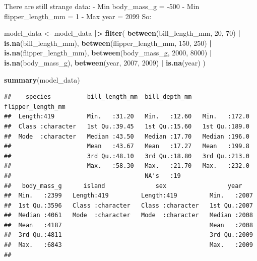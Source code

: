 \documentclass[
]{article}
\newenvironment{Shaded}{\begin{snugshade}}{\end{snugshade}}
\newcommand{\DecValTok}[1]{\textcolor[rgb]{0.00,0.00,0.81}{#1}}
\newcommand{\FunctionTok}[1]{\textcolor[rgb]{0.13,0.29,0.53}{\textbf{#1}}}
\newcommand{\NormalTok}[1]{#1}
\newcommand{\OtherTok}[1]{\textcolor[rgb]{0.56,0.35,0.01}{#1}}
\newcommand{\SpecialCharTok}[1]{\textcolor[rgb]{0.81,0.36,0.00}{\textbf{#1}}}
\begin{document}
There are still strange data: - Min body\_mass\_g = -500 - Min
flipper\_length\_mm = 1 - Max year = 2099 So:

\begin{Shaded}
\begin{Highlighting}[]
\NormalTok{model\_data }\OtherTok{\textless{}{-}}\NormalTok{ model\_data }\SpecialCharTok{|\textgreater{}}
  \FunctionTok{filter}\NormalTok{(}
    \FunctionTok{between}\NormalTok{(bill\_length\_mm, }\DecValTok{20}\NormalTok{, }\DecValTok{70}\NormalTok{) }\SpecialCharTok{|} \FunctionTok{is.na}\NormalTok{(bill\_length\_mm),}
    \FunctionTok{between}\NormalTok{(flipper\_length\_mm, }\DecValTok{150}\NormalTok{, }\DecValTok{250}\NormalTok{) }\SpecialCharTok{|} \FunctionTok{is.na}\NormalTok{(flipper\_length\_mm),}
    \FunctionTok{between}\NormalTok{(body\_mass\_g, }\DecValTok{2000}\NormalTok{, }\DecValTok{8000}\NormalTok{) }\SpecialCharTok{|} \FunctionTok{is.na}\NormalTok{(body\_mass\_g),}
    \FunctionTok{between}\NormalTok{(year, }\DecValTok{2007}\NormalTok{, }\DecValTok{2009}\NormalTok{) }\SpecialCharTok{|} \FunctionTok{is.na}\NormalTok{(year)}
\NormalTok{  )}
\end{Highlighting}
\end{Shaded}

\begin{Shaded}
\begin{Highlighting}[]
\FunctionTok{summary}\NormalTok{(model\_data)}
\end{Highlighting}
\end{Shaded}

\begin{verbatim}
##    species          bill_length_mm  bill_depth_mm   flipper_length_mm
##  Length:419         Min.   :31.20   Min.   :12.60   Min.   :172.0    
##  Class :character   1st Qu.:39.45   1st Qu.:15.60   1st Qu.:189.0    
##  Mode  :character   Median :43.50   Median :17.70   Median :196.0    
##                     Mean   :43.67   Mean   :17.27   Mean   :199.8    
##                     3rd Qu.:48.10   3rd Qu.:18.80   3rd Qu.:213.0    
##                     Max.   :58.30   Max.   :21.70   Max.   :232.0    
##                                     NA's   :19                       
##   body_mass_g      island              sex                 year     
##  Min.   :2399   Length:419         Length:419         Min.   :2007  
##  1st Qu.:3596   Class :character   Class :character   1st Qu.:2007  
##  Median :4061   Mode  :character   Mode  :character   Median :2008  
##  Mean   :4187                                         Mean   :2008  
##  3rd Qu.:4811                                         3rd Qu.:2009  
##  Max.   :6843                                         Max.   :2009  
## 
\end{verbatim}
\end{document}
